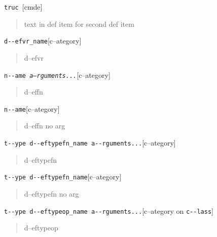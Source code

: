 \documentclass{book}
\newcommand\GNUTexinfocommandstyletextvar[1]{{\normalfont{}\textsl{#1}}}%
\begin{document}
\index[fn]{i@\texttt{\GNUTexinfocommandstyletextvar{i}}}%
\noindent\texttt{truc \EmbracOn{}\textnormal{\textsl{}}\EmbracOff{}}\hfill[cmde]

%
\begin{quote}
\unskip{\parskip=0pt\noindent}%
text in def item for second def item
\end{quote}


\noindent\texttt{d{-}{-}efvr\_name}\hfill[c--ategory]

%
\begin{quote}
\unskip{\parskip=0pt\noindent}%
d--efvr
\end{quote}

\noindent\texttt{n{-}{-}ame \EmbracOn{}\textnormal{\textsl{a--rguments...}}\EmbracOff{}}\hfill[c--ategory]

%
\begin{quote}
\unskip{\parskip=0pt\noindent}%
d--effn
\end{quote}

\noindent\texttt{n{-}{-}ame}\hfill[c--ategory]

%
\begin{quote}
\unskip{\parskip=0pt\noindent}%
d--effn no arg
\end{quote}

\noindent\texttt{t{-}{-}ype d{-}{-}eftypefn\_name a{-}{-}rguments...}\hfill[c--ategory]

%
\begin{quote}
\unskip{\parskip=0pt\noindent}%
d--eftypefn
\end{quote}

\noindent\texttt{t{-}{-}ype d{-}{-}eftypefn\_name}\hfill[c--ategory]

%
\begin{quote}
\unskip{\parskip=0pt\noindent}%
d--eftypefn no arg
\end{quote}

\noindent\texttt{t{-}{-}ype d{-}{-}eftypeop\_name a{-}{-}rguments...}\hfill[c--ategory on \texttt{c{-}{-}lass}]

%
\begin{quote}
\unskip{\parskip=0pt\noindent}%
d--eftypeop
\end{quote}
\end{document}
